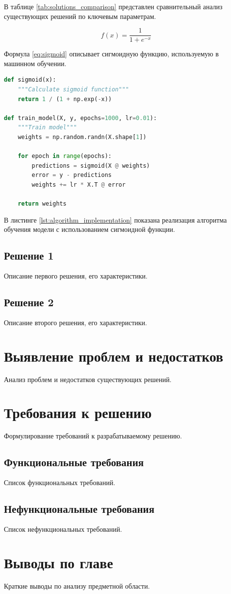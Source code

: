 В таблице \ref{tab:solutions_comparison} представлен сравнительный анализ существующих решений по ключевым параметрам.

\begin{equation}
f(x) = \frac{1}{1 + e^{-x}}
\label{eq:sigmoid}
\end{equation}

Формула \ref{eq:sigmoid} описывает сигмоидную функцию, используемую в машинном обучении.

\begin{lstlisting}[style=code, language=Python, caption={Пример реализации алгоритма}, label={lst:algorithm_implementation}]
def sigmoid(x):
    """Calculate sigmoid function"""
    return 1 / (1 + np.exp(-x))

def train_model(X, y, epochs=1000, lr=0.01):
    """Train model"""
    weights = np.random.randn(X.shape[1])
    
    for epoch in range(epochs):
        predictions = sigmoid(X @ weights)
        error = y - predictions
        weights += lr * X.T @ error
    
    return weights
\end{lstlisting}

В листинге \ref{lst:algorithm_implementation} показана реализация алгоритма обучения модели с использованием сигмоидной функции.

\subsection{Решение 1}

Описание первого решения, его характеристики.

\subsection{Решение 2}

Описание второго решения, его характеристики.

\section{Выявление проблем и недостатков}

Анализ проблем и недостатков существующих решений.

\section{Требования к решению}

Формулирование требований к разрабатываемому решению.

\subsection{Функциональные требования}

Список функциональных требований.

\subsection{Нефункциональные требования}

Список нефункциональных требований.

\section{Выводы по главе}

Краткие выводы по анализу предметной области.
